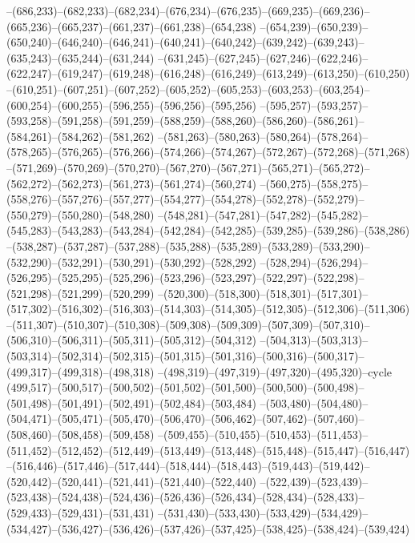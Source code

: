 --(686,233)--(682,233)--(682,234)--(676,234)--(676,235)--(669,235)--(669,236)--(665,236)--(665,237)--(661,237)--(661,238)--(654,238)
--(654,239)--(650,239)--(650,240)--(646,240)--(646,241)--(640,241)--(640,242)--(639,242)--(639,243)--(635,243)--(635,244)--(631,244)
--(631,245)--(627,245)--(627,246)--(622,246)--(622,247)--(619,247)--(619,248)--(616,248)--(616,249)--(613,249)--(613,250)--(610,250)
--(610,251)--(607,251)--(607,252)--(605,252)--(605,253)--(603,253)--(603,254)--(600,254)--(600,255)--(596,255)--(596,256)--(595,256)
--(595,257)--(593,257)--(593,258)--(591,258)--(591,259)--(588,259)--(588,260)--(586,260)--(586,261)--(584,261)--(584,262)--(581,262)
--(581,263)--(580,263)--(580,264)--(578,264)--(578,265)--(576,265)--(576,266)--(574,266)--(574,267)--(572,267)--(572,268)--(571,268)
--(571,269)--(570,269)--(570,270)--(567,270)--(567,271)--(565,271)--(565,272)--(562,272)--(562,273)--(561,273)--(561,274)--(560,274)
--(560,275)--(558,275)--(558,276)--(557,276)--(557,277)--(554,277)--(554,278)--(552,278)--(552,279)--(550,279)--(550,280)--(548,280)
--(548,281)--(547,281)--(547,282)--(545,282)--(545,283)--(543,283)--(543,284)--(542,284)--(542,285)--(539,285)--(539,286)--(538,286)
--(538,287)--(537,287)--(537,288)--(535,288)--(535,289)--(533,289)--(533,290)--(532,290)--(532,291)--(530,291)--(530,292)--(528,292)
--(528,294)--(526,294)--(526,295)--(525,295)--(525,296)--(523,296)--(523,297)--(522,297)--(522,298)--(521,298)--(521,299)--(520,299)
--(520,300)--(518,300)--(518,301)--(517,301)--(517,302)--(516,302)--(516,303)--(514,303)--(514,305)--(512,305)--(512,306)--(511,306)
--(511,307)--(510,307)--(510,308)--(509,308)--(509,309)--(507,309)--(507,310)--(506,310)--(506,311)--(505,311)--(505,312)--(504,312)
--(504,313)--(503,313)--(503,314)--(502,314)--(502,315)--(501,315)--(501,316)--(500,316)--(500,317)--(499,317)--(499,318)--(498,318)
--(498,319)--(497,319)--(497,320)--(495,320)--cycle
(499,517)--(500,517)--(500,502)--(501,502)--(501,500)--(500,500)--(500,498)--(501,498)--(501,491)--(502,491)--(502,484)--(503,484)
--(503,480)--(504,480)--(504,471)--(505,471)--(505,470)--(506,470)--(506,462)--(507,462)--(507,460)--(508,460)--(508,458)--(509,458)
--(509,455)--(510,455)--(510,453)--(511,453)--(511,452)--(512,452)--(512,449)--(513,449)--(513,448)--(515,448)--(515,447)--(516,447)
--(516,446)--(517,446)--(517,444)--(518,444)--(518,443)--(519,443)--(519,442)--(520,442)--(520,441)--(521,441)--(521,440)--(522,440)
--(522,439)--(523,439)--(523,438)--(524,438)--(524,436)--(526,436)--(526,434)--(528,434)--(528,433)--(529,433)--(529,431)--(531,431)
--(531,430)--(533,430)--(533,429)--(534,429)--(534,427)--(536,427)--(536,426)--(537,426)--(537,425)--(538,425)--(538,424)--(539,424)

